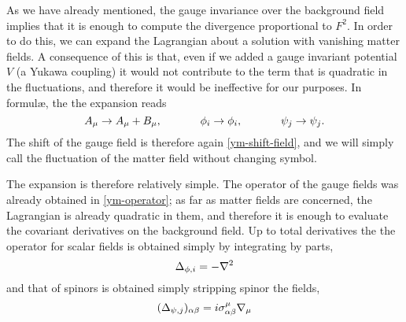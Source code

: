 As we have already mentioned, the gauge invariance over the background field implies that it is enough to compute the divergence proportional to $F^2$. In order to do this, we can expand the Lagrangian about a solution with vanishing matter fields.  A consequence of this is that, even if we added a gauge invariant potential $V$ (\eg a Yukawa coupling)  it would not contribute to the term that is quadratic in the fluctuations, and therefore it would be ineffective for our purposes. 
In formul\ae{}, the the expansion reads
\begin{equation}\label{bkg-with-matter}
A_\mu \rightarrow A_\mu + B_\mu ,
\hspace{3.5em}
\phi_i \rightarrow \phi_i,
\hspace{3.5em}
\psi_j \rightarrow \psi_j.
\end{equation}
The shift of the gauge field is therefore again \eqref{ym-shift-field}, and we will simply call the fluctuation of the matter field without changing symbol.


The expansion is therefore relatively simple. The operator of the gauge fields was already obtained in \eqref{ym-operator};
as far as matter fields are concerned, the Lagrangian is already quadratic in them, and therefore it is enough to evaluate the covariant derivatives on the background field. Up to total derivatives the the operator for scalar fields is obtained simply by integrating by parts,
\begin{equation}
\Delta_{\phi,i} = 
	- { \mathcal{\nabla} }^2
\end{equation}
and that of spinors is obtained simply stripping spinor the fields, \ie
\begin{equation}
(\Delta_{\psi,j})_{\alpha\beta} = 
	i \sigma^\mu_{\alpha\beta} { \mathcal{\nabla} }_\mu
\end{equation}


